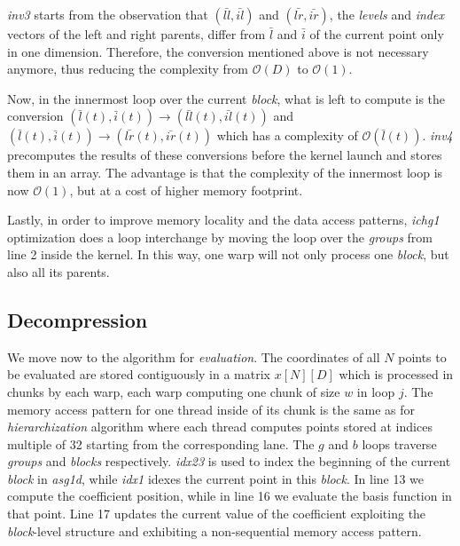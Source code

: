 \textit{inv3} starts from the observation that $(\bar{ll}, \bar{il})$ and
$(\bar{lr}, \bar{ir})$, the \textit{levels} and \textit{index} vectors of the
left and right parents, differ from $\bar{l}$ and $\bar{i}$ of the current point
only in one dimension. Therefore, the conversion mentioned above is not
necessary anymore, thus reducing the complexity from $\mathcal{O}(D)$ to
$\mathcal{O}(1)$.

Now, in the innermost loop over the current \textit{block}, what is left to
compute is the conversion $(\bar{l}(t), \bar{i}(t)) \rightarrow (\bar{ll}(t),
\bar{il}(t))$ and $(\bar{l}(t), \bar{i}(t)) \rightarrow (\bar{lr}(t),
\bar{ir}(t))$ which has a complexity of $\mathcal{O}(\bar{l}(t))$.
\textit{inv4} precomputes the results of these conversions before the kernel
launch and stores them in an array. The advantage is that the complexity of the
innermost loop is now $\mathcal{O}(1)$, but at a cost of higher memory
footprint.

Lastly, in order to improve memory locality and the data access patterns,
\textit{ichg1} optimization does a loop interchange by moving the loop over the
\textit{groups} from line 2 inside the kernel. In this way, one warp will not
only process one \textit{block}, but also all its parents.

\subsection{Decompression}

We move now to the algorithm for \textit{evaluation}. The coordinates of all $N$
points to be evaluated are stored contiguously in a matrix $x[N][D]$ which is
processed in chunks by each warp, each warp computing one chunk of size $w$ in
loop $j$. The memory access pattern for one thread inside of its chunk is the
same as for \textit{hierarchization} algorithm where each thread computes points
stored at indices multiple of 32 starting from the corresponding lane. The $g$
and $b$ loops traverse \textit{groups} and \textit{blocks} respectively.
\textit{idx23} is used to index the beginning of the current \textit{block} in
\textit{asg1d}, while \textit{idx1} idexes the current point in this
\textit{block}. In line 13 we compute the coefficient position, while in line 16
we evaluate the basis function in that point. Line 17 updates the current value
of the coefficient exploiting the \textit{block}-level structure and exhibiting
a non-sequential memory access pattern.

